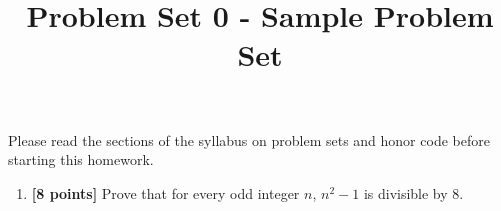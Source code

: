 \documentclass[11pt]{article}
\title{Problem Set 0 - Sample Problem Set}
\author{}
\date{}
\begin{document}
\maketitle

Please read the sections of the syllabus on problem sets and honor code before starting this homework.


\begin{enumerate}
\item  \textbf{[8 points]} Prove that for every odd integer $n$, $n^2-1$ is divisible by 8. 

\end{enumerate}
\end{document}
